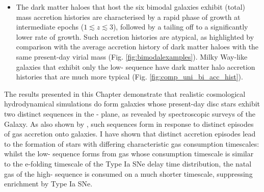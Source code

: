 \begin{itemize}
\item The dark matter haloes that host the six bimodal galaxies exhibit (total) mass accretion histories are characterised by a rapid phase of growth at intermediate epochs ($1 \lesssim z \lesssim 3$), followed by a tailing off to a significantly lower rate of growth. Such accretion histories are atypical, as highlighted by comparison with the average accretion history of dark matter haloes with the same present-day virial mass (Fig. \ref{fig:bimodalexamples}). Milky Way-like galaxies that exhibit only the low-\afe{} sequence have dark matter halo accretion histories that are much more typical (Fig. \ref{fig:comp_uni_bi_acc_hist}). 

\end{itemize}

The results presented in this Chapter demonstrate that realistic cosmological hydrodynamical simulations do form galaxies whose present-day disc stars exhibit two distinct sequences in the \afe{}-\feh{} plane, as revealed by spectroscopic surveys of the Galaxy. As also shown by \citet{2017arXiv170807834G}, such sequences form in response to distinct episodes of gas accretion onto galaxies. I have shown that distinct accretion episodes lead to the formation of stars with differing characteristic gas consumption timescales: whilst the low-\afe{} sequence forms from gas whose consumption timescale is similar to the e-folding timescale of the Type Ia SNe delay time distribution, the natal gas of the high-\afe{} sequence is consumed on a much shorter timescale, suppressing enrichment by Type Ia SNe.

